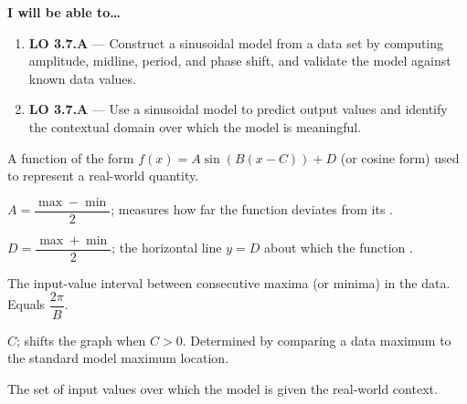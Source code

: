 \documentclass[10pt]{article}
\begin{document}
\namedateperiod

\vspace{0.10in}

\begin{objectivebox}
\textbf{I will be able to\ldots}
\begin{enumerate}[leftmargin=1.5em, itemsep=4pt]
  \item \textbf{LO 3.7.A} --- Construct a sinusoidal model from a data set by
    computing amplitude, midline, period, and phase shift, and validate the
    model against known data values.
  \item \textbf{LO 3.7.A} --- Use a sinusoidal model to predict output values
    and identify the contextual domain over which the model is meaningful.
\end{enumerate}
\end{objectivebox}

\vspace{0.08in}

\begin{vocabbox}
\begin{description}[leftmargin=0pt, itemsep=6pt]
  \item[\termblanklong{sinusoidal model}]
    A function of the form $f(x) = A\sin(B(x - C)) + D$ (or cosine form) used
    to represent a  real-world quantity.

  \item[\termblanklong{amplitude}]
    $A = \dfrac{\max - \min}{2}$; measures how far the function deviates from
    its .

  \item[\termblanklong{vertical shift / midline}]
    $D = \dfrac{\max + \min}{2}$; the horizontal line $y = D$ about which the
    function .

  \item[\termblanklong{period}]
    The  input-value interval between consecutive maxima
    (or minima) in the data. Equals $\dfrac{2\pi}{B}$.

  \item[\termblanklong{phase shift}]
    $C$; shifts the graph  when $C > 0$. Determined
    by comparing a data maximum to the standard model maximum location.

  \item[\termblanklong{contextual domain}]
    The set of input values over which the model is 
    given the real-world context.
\end{description}
\end{vocabbox}
\end{document}
